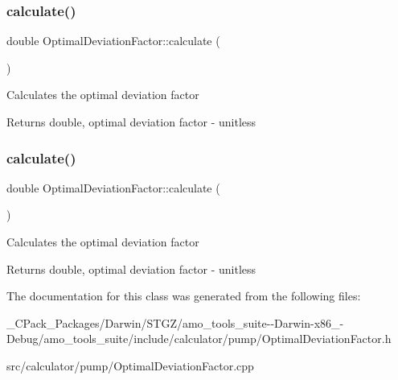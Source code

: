 \subsubsection{\texorpdfstring{calculate()}{calculate()}\hspace{0.1cm}{\footnotesize\ttfamily [2/3]}}
{\footnotesize\ttfamily double Optimal\+Deviation\+Factor\+::calculate (\begin{DoxyParamCaption}{ }\end{DoxyParamCaption})}

Calculates the optimal deviation factor \begin{DoxyReturn}{Returns}
double, optimal deviation factor -\/ unitless 
\end{DoxyReturn}
\mbox{\label{class_optimal_deviation_factor_aaa6687bb46d275c4cbcfe44caf895a37}} 
\subsubsection{\texorpdfstring{calculate()}{calculate()}\hspace{0.1cm}{\footnotesize\ttfamily [3/3]}}
{\footnotesize\ttfamily double Optimal\+Deviation\+Factor\+::calculate (\begin{DoxyParamCaption}{ }\end{DoxyParamCaption})}

Calculates the optimal deviation factor \begin{DoxyReturn}{Returns}
double, optimal deviation factor -\/ unitless 
\end{DoxyReturn}


The documentation for this class was generated from the following files\+:\begin{DoxyCompactItemize}
\item 
\+\_\+\+C\+Pack\+\_\+\+Packages/\+Darwin/\+S\+T\+G\+Z/amo\+\_\+tools\+\_\+suite-\/-\/\+Darwin-\/x86\+\_-\/\+Debug/amo\+\_\+tools\+\_\+suite/include/calculator/pump/Optimal\+Deviation\+Factor.\+h\item 
src/calculator/pump/Optimal\+Deviation\+Factor.\+cpp\end{DoxyCompactItemize}

